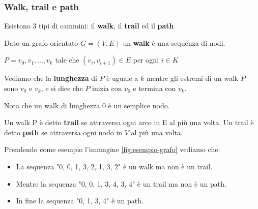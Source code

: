 \subsubsection{Walk, trail e path}
Esistono 3 tipi di cammini: il \textbf{walk}, il \textbf{trail} ed il \textbf{path}
\begin{definition}[Walk]
    Dato un grafo orientato $G = (V,E)$ un \textbf{walk} è una sequenza di nodi.
    \begin{center}
        $P = v_0, v_1, ..., v_k$ tale che $(v_i,v_{i+1}) \in E$ per ogni $i \in K$
    \end{center}
\end{definition}
\hspace{-15pt}Vediamo che la \textbf{lunghezza} di $P$ è uguale a $k$ mentre gli estremi di un walk $P$ sono $v_0$ e $v_k$, e si dice che $P$ inizia con $v_0$ e termina con $v_k$.
\begin{note}
Nota che un walk di lunghezza 0 è un semplice nodo.
\end{note}

\begin{definition}
    Un walk P è detto \textbf{trail} se attraversa ogni arco in E al più una volta. Un trail è detto \textbf{path} se attraversa ogni nodo in $V$ al più una volta.
\end{definition}

\begin{example}
    Prendendo come esempio l'immagine \ref{fig:esempio-grafo} vediamo che:
    \begin{itemize}
        \item La sequenza "0, 0, 1, 3, 2, 1, 3, 2" è un walk ma non è un trail.
        \item Mentre la sequenza "0, 0, 1, 3, 4, 3, 4" è un trail ma non è un path.
        \item In fine la sequenza "0, 1, 3, 4" è un path.
    \end{itemize}
\end{example}

